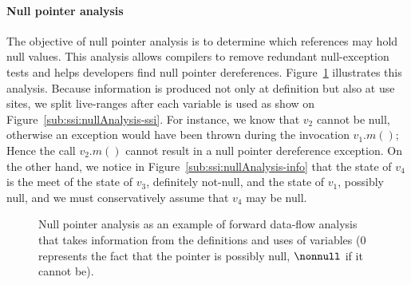 {\paragraph{Null pointer analysis} The objective of null pointer 
analysis is to 
determine which references may hold null values.
This analysis allows compilers to remove redundant null-exception tests and 
helps developers find null pointer dereferences.
Figure~\ref{fig:ssi:nullAnalysis} illustrates this analysis.
Because information is produced not only at definition but also at use sites, 
we split live-ranges after each variable is used as show on Figure~\ref{sub:ssi:nullAnalysis-ssi}.
For instance, we know that $v_2$ cannot be null, otherwise an exception would 
have been thrown during the invocation $v_1.m()$;
Hence the call $v_2.m()$ cannot result in a null pointer dereference exception.
On the other hand, we notice in Figure~\ref{sub:ssi:nullAnalysis-info} that the 
state of $v_4$ is the meet of the state of $v_3$, definitely not-null, and the 
state of $v_1$, possibly null, and we must conservatively assume that $v_4$ may 
be null.


\begin{figure}[t!]
  \subfloat[]{
    \label{sub:ssi:nullAnalysis-cfg}
    \useheightbox
  }
  \hfill
  \hfill
\caption{Null pointer analysis as an example of forward data-flow analysis that takes information from the definitions and uses of variables ($0$ represents the fact that the pointer is possibly null, $\nonnull$ if it cannot be).} \label{fig:ssi:nullAnalysis}
\end{figure}


}
